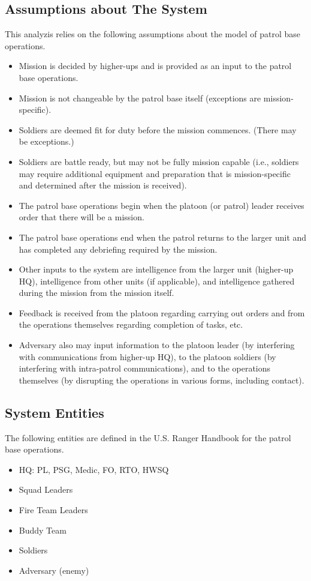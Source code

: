 \documentclass[../../main/main.tex]{subfiles}
\begin{document}
\subsection{Assumptions about The System}
This analyzis relies on the following assumptions about the model of patrol base operations.

\begin{itemize}
\item Mission is decided by higher-ups and is provided as an input to the patrol base operations.
\item Mission is not changeable by the patrol base itself (exceptions are mission-specific).
\item Soldiers are deemed fit for duty before the mission commences.   (There may be exceptions.)
\item Soldiers are battle ready, but may not be fully mission capable (i.e., soldiers may require additional equipment and preparation that is mission-specific and determined after the mission is received).
\item The patrol base operations begin when the platoon (or patrol) leader receives order that there will be a mission.
\item The patrol base operations end when the patrol returns to the larger unit and has completed any debriefing required by the mission.
\item Other inputs to the system are intelligence from the larger unit (higher-up HQ), intelligence from other units (if applicable), and intelligence gathered during the mission from the mission itself. 
\item Feedback is received from the platoon regarding carrying out orders and from the operations themselves regarding completion of tasks, etc.  
\item Adversary also may input information to the platoon leader (by interfering with communications from higher-up HQ), to the platoon soldiers (by interfering with intra-patrol communications), and to the operations themselves (by disrupting the operations in various forms, including contact).
\end{itemize}


\subsection{System Entities}
The following entities are defined in the U.S. Ranger Handbook for the patrol base operations.  
\begin{itemize}
\item HQ: PL, PSG, Medic, FO, RTO, HWSQ
\item Squad Leaders
\item Fire Team Leaders
\item Buddy Team
\item Soldiers
\item Adversary (enemy)
\end{itemize}
\end{document}
